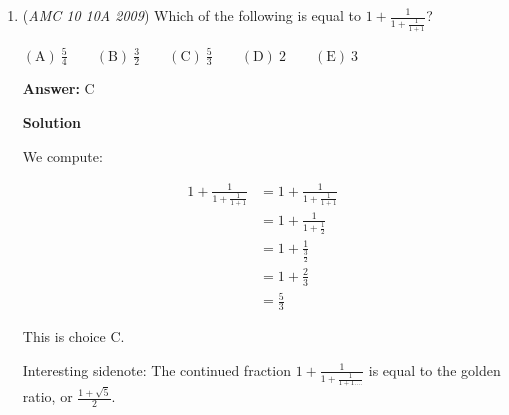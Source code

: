 \begin{enumerate}
 \href{https://artofproblemsolving.com/wiki/index.php?title=User:Maxisw}{MisW} (\href{https://artofproblemsolving.com/wiki/index.php?title=User\_talk:Maxisw}{talk})Minor Edits by \href{https://artofproblemsolving.com/wiki/index.php?title=Yanchudeng&action=edit&redlink=1}{yanchudeng}

 Post-Note: This is my first time using LaTeX so it may look a little ugly.

 



\textbf{Solution 2}

This problem is trivial under the fact that there are a total of 256 combinations of pennies (P), nickels (N), dimes (D), and quarters (Q). We can start listing every combination from the lowest, 4 pennies (4P), which is 4 cents. Notice how we can replace pennies with nickels, as 3 pennies and 1 nickel (3P1N) is 8 cents, 2 pennies and 2 nickels (2P2N), is 12 cents, and 3 pennies and 1 dime (3P1D), is 13 cents. Since the next jump is obviously replacing a penny with a nickel, we can see in both scenarios, we end up with 16 cents and 17 cents respectively. In conclusion, A.

 


	\item (\textit{AMC 10 10A 2009}) Which of the following is equal to $1 + \frac{1}{1+\frac{1}{1+1}}$?


 $\mathrm{(A)}\ \frac{5}{4} \qquad \mathrm{(B)}\ \frac{3}{2} \qquad \mathrm{(C)}\ \frac{5}{3} \qquad \mathrm{(D)}\ 2 \qquad \mathrm{(E)}\ 3$

 \textbf{Answer: }C



\textbf{Solution}

We compute:

 
 \begin{align*} 1 + \frac {1}{1 + \frac {1}{1 + 1}} &= 1 + \frac {1}{1 + \frac {1}{1 + 1}} \\ &= 1 + \frac {1}{1 + \frac 12} \\ &= 1 + \frac {1}{\frac 32} \\ &= 1 + \frac 23 \\ &= \frac 53 \end{align*}


 This is choice $\boxed{\text{C}}$.

 Interesting sidenote: The continued fraction $1 + \frac {1}{1 + \frac {1}{1 + 1....}}$ is equal to the golden ratio, or $\frac{1+\sqrt{5}}{2}$.

 



\end{enumerate}
